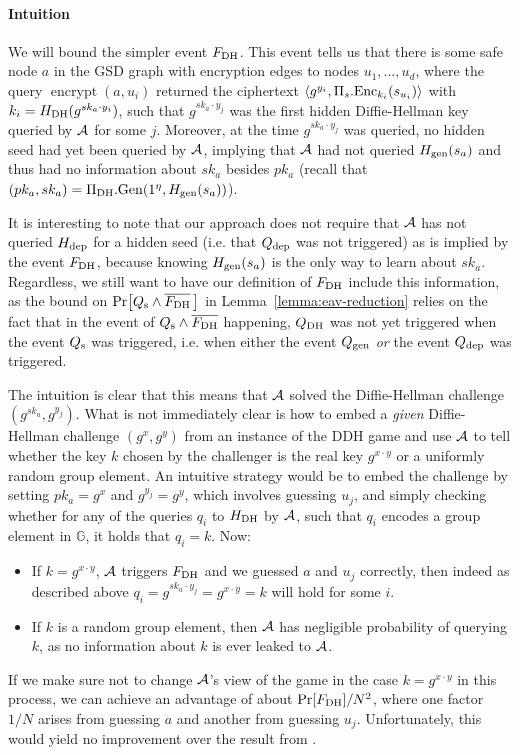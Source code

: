 \paragraph{Intuition} We will bound the simpler event $F_\mathrm{DH}$. This event tells us that there is some safe node $a$ in the GSD graph with encryption edges to nodes $u_1, \ldots, u_d$, where the query $\operatorname{encrypt}(a, u_i)$ returned the ciphertext $\langle g^{y_i}, \Pi_s.\mathrm{Enc}_{k_i}(s_{u_i}) \rangle$ with $k_i = H_\mathrm{DH}(g^{sk_{a} \cdot y_i})$, such that $g^{sk_a \cdot y_j}$ was the first hidden Diffie-Hellman key queried by $\mathcal{A}$ for some $j$.
Moreover, at the time $g^{sk_a \cdot y_j}$ was queried, no hidden seed had yet been queried by $\mathcal{A}$, implying that $\mathcal{A}$ had not queried $H_\mathrm{gen}(s_a)$ and thus had no information about $sk_a$ besides $pk_a$ (recall that $(pk_a, sk_a) = \Pi_{\mathrm{DH}}.\mathrm{Gen}(1^\eta, H_\mathrm{gen}(s_a))$).


It is interesting to note that our approach does not require that $\mathcal{A}$ has not queried $H_\mathrm{dep}$ for a hidden seed (i.e. that $Q_\mathrm{dep}$ was not triggered) as is implied by the event $F_\mathrm{DH}$, because knowing $H_\mathrm{gen}(s_a)$ is the only way to learn about $sk_a$. Regardless, we still want to have our definition of $F_\mathrm{DH}$ include this information, as the bound on $\pr{\qs \land \overline{\fdh} \,}$ in Lemma~\vref{lemma:eav-reduction} relies on the fact that in the event of $Q_\mathrm{s} \land \overline{F_\mathrm{DH}}$ happening,  $Q_\mathrm{DH}$ was not yet triggered when the event $Q_\mathrm{s}$ was triggered, i.e. when either the event $Q_\mathrm{gen}$ \emph{or} the event $Q_\mathrm{dep}$ was triggered.

The intuition is clear that this means that $\mathcal{A}$ solved the Diffie-Hellman challenge $(g^{sk_a}, g^{y_j})$. What is not immediately clear is how to embed a \emph{given} Diffie-Hellman challenge $(g^x, g^y)$  from an instance of the DDH game and use $\mathcal{A}$ to tell whether the key $k$ chosen by the challenger is the real key $g^{x \cdot y}$ or a uniformly random group element.
An intuitive strategy would be to embed the challenge by setting $pk_a = g^x$ and $g^{y_j} = g^y$, which involves guessing $u_j$, and simply checking whether for any of the queries $q_i$ to $H_\mathrm{DH}$ by $\mathcal{A}$, such that $q_i$ encodes a group element in $\mathbb{G}$, it holds that $q_i = k$. Now:
\begin{itemize}
	\item If $k = g^{x \cdot y}$, $\mathcal{A}$ triggers $F_\mathrm{DH}$ and we guessed $a$ and $u_j$ correctly, then indeed as described above $q_i = g^{sk_a \cdot y_j} = g^{x \cdot y} = k$ will hold for some $i$.
	\item If $k$ is a random group element, then $\mathcal{A}$ has negligible probability of querying $k$, as no information about $k$ is ever leaked to $\mathcal{A}$.
\end{itemize}
If we make sure not to change $\mathcal{A}$'s view of the game in the case $k = g^{x \cdot y}$ in this process, we can achieve an advantage of about $\pr{\fdh} / N^2$, where one factor $1/N$ arises from guessing $a$ and another from guessing $u_j$. Unfortunately, this would yield no improvement over the result from \cite{ttkem}.

